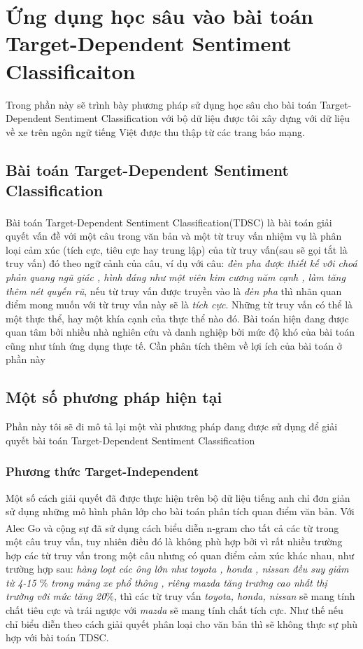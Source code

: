 \documentclass[fontsize=12pt]{scrartcl}
\begin{document}
\section{Ứng dụng học sâu vào bài toán Target-Dependent Sentiment Classificaiton}\label{EMforBTM}
\par
Trong phần này sẽ trình bày phương pháp sử dụng học sâu cho bài toán Target-Dependent Sentiment Classification với bộ dữ liệu được tôi xây dựng với dữ liệu về xe trên ngôn ngữ tiếng Việt được thu thập từ các trang báo mạng.
\subsection{Bài toán Target-Dependent Sentiment Classification}
\par
Bài toán Target-Dependent Sentiment Classification(TDSC)\textsuperscript{\cite{tang2015effective}} là bài toán giải quyết vấn đề với một câu trong văn bản và một từ truy vấn nhiệm vụ là phân loại cảm xúc (tích cực, tiêu cực hay trung lập) của từ truy vấn(sau sẽ gọi tắt là truy vấn) đó theo ngữ cảnh của câu, ví dụ với câu: \textit{đèn pha được thiết kế với choá phản quang ngũ giác , hình dáng như một viên kim cương năm cạnh , làm tăng thêm nét quyến rũ}, nếu từ truy vấn được truyền vào là \textit{đèn pha} thì nhãn quan điểm mong muốn với từ truy vấn này sẽ là \textit{tích cực}. Những từ truy vấn có thể là một thực thể, hay một khía cạnh của thực thể nào đó. Bài toán hiện đang được quan tâm bởi nhiều nhà nghiên cứu và danh nghiệp bởi mức độ khó của bài toán cũng như tính ứng dụng thực tế.
Cần phân tích thêm về lợi ích của bài toán ở phần này
\subsection{Một số phương pháp hiện tại}
Phần này tôi sẽ đi mô tả lại một vài phương pháp đang được sử dụng để giải quyết bài toán Target-Dependent Sentiment Classification
\subsubsection{Phương thức Target-Independent}
Một số cách giải quyết đã được thực hiện trên bộ dữ liệu tiếng anh chỉ đơn giản sử dụng những mô hình phân lớp cho bài toán phân tích quan điểm văn bản. Với Alec Go và cộng sự\textsuperscript{\cite{go2009twitter}} đã sử dụng cách biểu diễn n-gram cho tất cả các từ trong một câu truy vấn, tuy nhiên điều đó là không phù hợp bởi vì rất nhiều trường hợp các từ truy vấn trong một câu nhưng có quan điểm cảm xúc khác nhau, như trường hợp sau: \textit{hàng loạt các ông lớn như toyota , honda , nissan đều suy giảm từ 4-15 $\%$ trong mảng xe phổ thông , riêng mazda tăng trưởng cao nhất thị trường với mức tăng 20$\%$}, thì các từ truy vấn \textit{toyota, honda, nissan} sẽ mang tính chất tiêu cực và trái ngược với \textit{mazda} sẽ mang tính chất tích cực. Như thế nếu chỉ biểu diễn theo cách giải quyết phân loại cho văn bản thì sẽ không thực sự phù hợp với bài toán TDSC.
\end{document}
